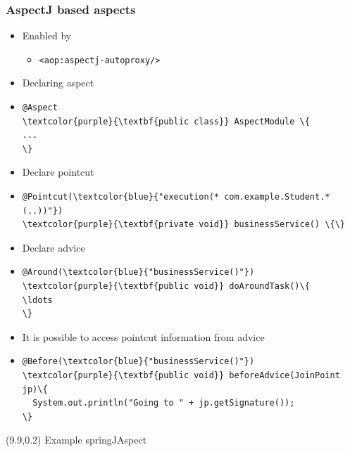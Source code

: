 \documentclass[10pt,xcolor=pdflatex, table]{beamer}
\begin{document}
\begin{frame}[fragile]\frametitle{AspectJ based aspects}
	\begin{itemize}
		\item Enabled by
        \begin{itemize}
        	\item \texttt{<aop:aspectj-autoproxy/>}
        \end{itemize}
		\item Declaring aspect
        \item[]
        	\begin{Verbatim}[fontsize=\footnotesize, commandchars=\\\{\}]
@Aspect
\textcolor{purple}{\textbf{public class}} AspectModule \{
...
\}
			\end{Verbatim}
		\item Declare pointcut
        \item[]
        	\begin{Verbatim}[fontsize=\footnotesize, commandchars=\\\{\}]
@Pointcut(\textcolor{blue}{"execution(* com.example.Student.*(..))"})
\textcolor{purple}{\textbf{private void}} businessService() \{\}
			\end{Verbatim}
		\item Declare advice
        \item[]
        	\begin{Verbatim}[fontsize=\footnotesize, commandchars=\\\{\}]
@Around(\textcolor{blue}{"businessService()"})
\textcolor{purple}{\textbf{public void}} doAroundTask()\{
\ldots
\}
			\end{Verbatim}
        \item It is possible to access pointcut information from advice
        \item[] \begin{Verbatim}[fontsize=\footnotesize, commandchars=\\\{\}]
@Before(\textcolor{blue}{"businessService()"})
\textcolor{purple}{\textbf{public void}} beforeAdvice(JoinPoint jp)\{
  System.out.println("Going to " + jp.getSignature());
\}
			    \end{Verbatim}
	\end{itemize}
\begin{textblock}{15}(9.9,0.2)
    {\footnotesize Example springJAspect}
\end{textblock}
\end{frame}
\end{document}
